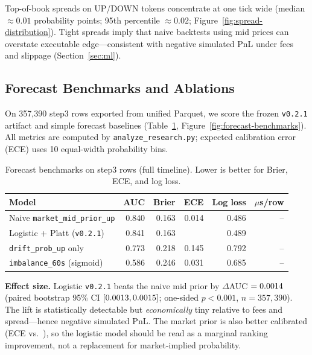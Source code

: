 Top-of-book spreads on UP/DOWN tokens concentrate at one tick wide
(median $\approx 0.01$ probability points; 95th percentile $\approx 0.02$;
Figure~\ref{fig:spread-distribution}). Tight spreads imply that naive backtests
using mid prices can overstate executable edge---consistent with negative
simulated PnL under fees and slippage (Section~\ref{sec:ml}).

\subsection{Forecast Benchmarks and Ablations}
\label{sec:insights-forecast}

On 357{,}390 step3 rows exported from unified Parquet, we score the frozen
\texttt{v0.2.1} artifact and simple forecast baselines
(Table~\ref{tab:forecast-benchmarks}, Figure~\ref{fig:forecast-benchmarks}).
All metrics are computed by \texttt{analyze\_research.py}; expected calibration
error (ECE) uses 10 equal-width probability bins.

\begin{table}[t]
  \centering
  \caption{Forecast benchmarks on step3 rows (full timeline). Lower is better
    for Brier, ECE, and log loss.}
  \label{tab:forecast-benchmarks}
  \small
  \begin{tabular}{@{}lrrrrr@{}}
    \toprule
    Model & AUC & Brier & ECE & Log loss & $\mu$s/row \\
    \midrule
    Naive \texttt{market\_mid\_prior\_up} & 0.840 & 0.163 & 0.014 & 0.486 & -- \\
    Logistic + Platt (\texttt{v0.2.1})    & 0.841 & 0.163 & \OpenMarketLogisticEce{} & 0.489 & \OpenMarketLogisticScoreUs{} \\
    \texttt{drift\_prob\_up} only         & 0.773 & 0.218 & 0.145 & 0.792 & -- \\
    \texttt{imbalance\_60s} (sigmoid)     & 0.586 & 0.246 & 0.031 & 0.685 & -- \\
    \bottomrule
  \end{tabular}
\end{table}

\textbf{Effect size.} Logistic \texttt{v0.2.1} beats the naive mid prior by
$\Delta$AUC $= 0.0014{}$ (paired bootstrap 95\% CI
$[0.0013{}, 0.0015{}]$; one-sided
$p < 0.001$, $n=357{,}390$). The lift is statistically
detectable but \emph{economically} tiny relative to fees and spread---hence
negative simulated PnL. The market prior is also better calibrated
(ECE \OpenMarketNaiveEce{} vs.\ \OpenMarketLogisticEce{}), so the logistic
model should be read as a marginal ranking improvement, not a replacement for
market-implied probability.


